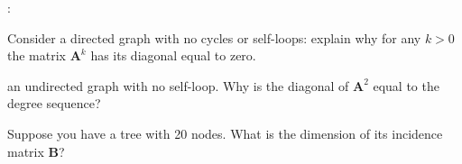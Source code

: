 \documentclass[11pt]{exam}
\begin{document}
\clearpage
\begin{questions}
:
\begin{parts}
\item Consider a directed graph with no cycles or self-loops: explain why for any $k>0$ the matrix $\bm A^k$ has its diagonal equal to zero.  
\item an undirected graph with no self-loop. Why is the diagonal of $\bm A^2$ equal to the degree sequence?
\item Suppose you have a tree with 20 nodes. What is the dimension of its incidence matrix $\bm B$?
\end{parts}





\end{questions}
\end{document}
